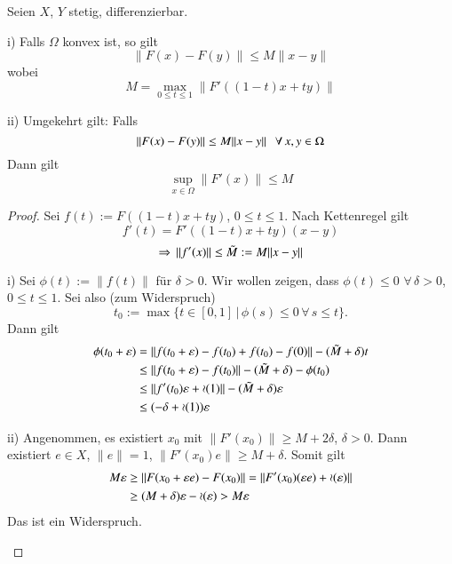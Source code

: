 \begin{theorem}[Mittelwert]\label{1.15}
    Seien $X$, $Y$ stetig, differenzierbar.
    \begin{description}
    \item{i)}
    Falls $\Omega$ konvex ist, so gilt
    \[
        \|F(x)-F(y)\|\leq M\|x-y\|
    \]
    wobei
    \[
        M=\max_{0\leq t \leq 1}\| F'((1-t)x + ty) \|
    \]
    \item{ii)}
    Umgekehrt gilt: Falls
    \[
        \| F(x)-F(y) \|\leq M\|x-y\| \hspace{.25cm} \forall \, x,y\in \Omega
    \]
    Dann gilt
    \[
        \sup_{x\in \Omega}\|F'(x)\|\leq M
    \]
    \end{description}
\end{theorem}

\begin{proof}
    Sei $f(t):= F((1-t)x+ty)$, $0\leq t\leq1$. Nach Kettenregel gilt
    \[
        f'(t)=F'((1-t)x+ty)(x-y)  
    \]
    \[
        \Rightarrow \, \|f'(x)\|\leq\tilde M:= M\|x-y\|  
    \]
    \begin{description}
    \item{i)}
    Sei $\phi(t):=\|f(t)\|$ für $\delta>0$. Wir wollen zeigen, dass $\phi(t)\leq0$ $\forall \, 
    \delta>0$, $0\leq t\leq1$. Sei also (zum Widerspruch)
    \[
        t_0:=\max\{t\in [0,1]\, | \, \phi(s)\leq 0 \, \forall \, s\leq t\}.
    \]
    Dann gilt
    \begin{align*}
        \phi(t_0+\varepsilon)&=\|f(t_0+\varepsilon)-f(t_0)+f(t_0)-f(0)\|-(\tilde M + \delta)t\\
        &\leq \|f(t_0+\varepsilon)-f(t_0)\|-(\tilde M +\delta) -\phi(t_0)\\
        &\leq \|f'(t_0)\varepsilon+ \mathcal o (1)\|-(\tilde M +\delta)\varepsilon\\
        &\leq (-\delta + \mathcal o (1))\varepsilon 
    \end{align*}
    \item{ii)}
    Angenommen, es existiert $x_0$ mit $\|F'(x_0)\|\geq M+2\delta$, $\delta>0$. Dann existiert
    $e\in X$, $\|e\|=1$, $\| F'(x_0)e \|\geq M+\delta$. Somit gilt
    \begin{align*}
        M\varepsilon&\geq \|F(x_0+\varepsilon e) - F(x_0)\|= \|F'(x_0)(\varepsilon e)+\mathcal o (\varepsilon)\|\\
         &\geq (M+\delta)\varepsilon- \mathcal o(\varepsilon) > M\varepsilon
    \end{align*}
    Das ist ein Widerspruch.
    \end{description}
    \[\]
\end{proof}

